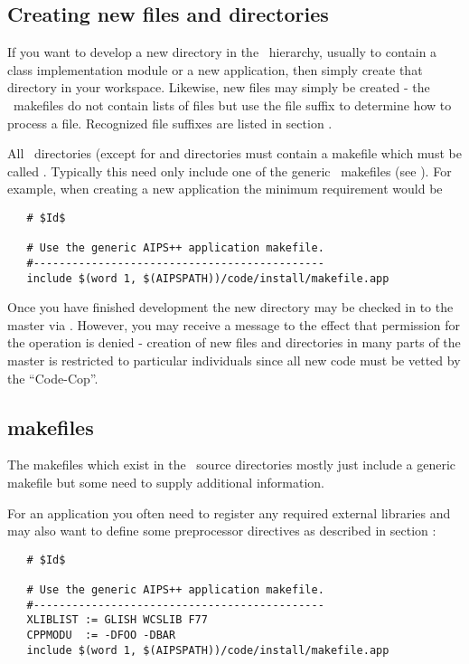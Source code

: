 \subsection*{Creating new files and directories}

If you want to develop a new directory in the \aipspp\ hierarchy, usually to
contain a class implementation module or a new application, then simply create
that directory in your workspace.  Likewise, new files may simply be created -
the \aipspp\ makefiles do not contain lists of files but use the file suffix
to determine how to process a file.  Recognized file suffixes are listed in
section .

All \aipspp\ directories (except for  and 
directories must contain a makefile which must be called .
Typically this need only include one of the generic \aipspp\ makefiles (see
).  For example, when creating a new application the minimum
requirement would be

\begin{verbatim}
   # $Id$
 
   # Use the generic AIPS++ application makefile.
   #---------------------------------------------
   include $(word 1, $(AIPSPATH))/code/install/makefile.app
\end{verbatim}

\noindent
Once you have finished development the new directory may be checked in to the
master via .  However, you may receive a message to the effect that
permission for the operation is denied - creation of new files and directories
in many parts of the master is restricted to particular individuals since all
new code must be vetted by the ``Code-Cop''.

\subsection*{makefiles}

The makefiles which exist in the \aipspp\ source directories mostly just
include a generic makefile but some need to supply additional information.

For an application you often need to register any required external libraries
and may also want to define some preprocessor directives as described in
section :
 
\begin{verbatim}
   # $Id$
 
   # Use the generic AIPS++ application makefile.
   #---------------------------------------------
   XLIBLIST := GLISH WCSLIB F77
   CPPMODU  := -DFOO -DBAR
   include $(word 1, $(AIPSPATH))/code/install/makefile.app
\end{verbatim}

